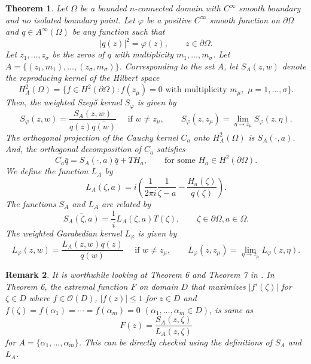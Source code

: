 \documentclass[11pt, reqno]{amsart}
\newtheorem{thm}{Theorem}[section]
\newtheorem{rem}[thm]{Remark}
\numberwithin{equation}{section}
\newcommand{\ov}{\overline}
\newcommand{\Om}{\Omega}
\begin{document}
\begin{thm}\label{neh}
Let $\Om$ be a bounded $n$-connected domain with $C^{\infty}$ smooth boundary and no isolated boundary point. Let $\varphi$ be a positive $C^{\infty}$ smooth function on $\partial\Om$ and $q\in A^{\infty}(\Om)$ be any function such that
\[
\vert q(z)\vert^2 = \varphi(z),
\quad\quad z\in\partial\Om.
\]
Let $z_1,\ldots,z_{\sigma}$ be the zeros of $q$ with multiplicity $m_1,\ldots,m_{\sigma}$. Let $A=\{(z_1,m_1),\ldots,(z_{\sigma},m_{\sigma})\}$. Corresponding to the set $A$, let $S_{A}(z,w)$ denote the reproducing kernel of the Hilbert space
\[
H_{A}^2(\Omega) = \{f\in H^2(\partial\Omega): f(z_{\mu}) = 0 \text{ with multiplicity }m_{\mu}, \,\,\mu = 1,\ldots,\sigma\}.
\]
Then, the weighted Szeg\H{o} kernel $S_{\varphi}$ is given by
\[
S_{\varphi}(z,w) = \frac{S_A(z,w)}{q(z)\ov{q(w)}}
\quad \text{ if }w\neq z_\mu,
\quad\quad
S_{\varphi}(z,z_{\mu}) = \lim\limits_{\eta\rightarrow z_{\mu}}  S_{\varphi}(z,\eta).
\]
The orthogonal projection of the Cauchy kernel $C_a$ onto $H_A^2(\Om)$ is $S_A(\cdot,a)$. And, the orthogonal decomposition of $C_a$ satisfies
\[
C_a \bar{q}= S_A(\cdot, a) \bar{q} + \overline{TH_a}, 
\quad\quad \text{for some }H_a\in H^2(\partial\Om).
\]
We define the function $L_A$ by
\[
L_A(\zeta,a) = i \left(\frac{1}{2\pi i}\frac{1}{\zeta - a}- \frac{H_a(\zeta)}{q(\zeta)}\right).
\]
The functions $S_A$ and $L_A$ are related by
\[
\overline{S_A(\zeta,a)} = \frac{1}{i} L_A(\zeta,a) T(\zeta),
\quad \quad \zeta\in\partial\Om, a\in\Om.
\]
The weighted Garabedian kernel $L_{\varphi}$ is given by
\[
L_{\varphi}(z,w) = \frac{L_A(z,w) q(z)}{q(w)}
\quad \text{ if } w\neq z_{\mu},
\quad\quad
L_{\varphi}(z,z_{\mu}) = \lim\limits_{\eta\rightarrow z_{\mu}} L_{\varphi}(z,\eta).
\]
\end{thm}

\begin{rem} 
	It is worthwhile looking at Theorem 6 and Theorem 7 in \cite{Nehari}. In Theorem 6, the extremal function $F$ on domain $D$ that maximizes $\vert f'(\zeta)\vert$ for $\zeta\in D$ where $f\in\mathcal{O}(D)$, $\vert f(z)\vert\leq 1$ for $z\in D$ and $f(\zeta) = f(\alpha_1) = \cdots=f(\alpha_m)=0$ $(\alpha_1,\ldots,\alpha_m\in D)$, is same as
	\begin{equation}
	F(z) = \frac{S_A(z,\zeta)}{L_A(z,\zeta)}
	\end{equation}
	for $A = \{\alpha_1,\ldots,\alpha_m\}$. This can be directly checked using the definitions of $S_A$ and $L_A$.
\end{rem}
\end{document}
